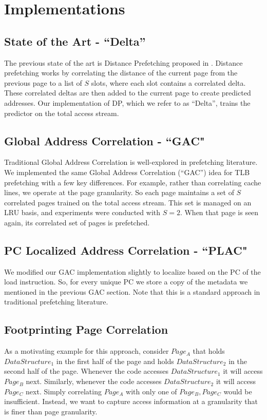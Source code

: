 \documentclass[conference]{IEEEtran}
\begin{document}
\section{Implementations} \label{Implementation}
    \subsection{State of the Art - ``Delta''}
        The previous state of the art is Distance Prefetching proposed in \cite{c1}. Distance prefetching works by correlating the distance of the current page from the previous page to a list of $S$ slots, where each slot contains a correlated delta. These correlated deltas are then added to the current page to create predicted addresses. Our implementation of DP, which we refer to as “Delta”, trains the predictor on the total access stream.     
    \subsection{Global Address Correlation - ``GAC"}
        Traditional Global Address Correlation is well-explored in prefetching literature. We implemented the same Global Address Correlation (``GAC'') idea for TLB prefetching with a few key differences. For example, rather than correlating cache lines, we operate at the page granularity. So each page maintains a set of $S$ correlated pages trained on the total access stream. This set is managed on an LRU basis, and experiments were conducted with $S = 2$. When that page is seen again, its correlated set of pages is prefetched. 
        
    \subsection{PC Localized Address Correlation - ``PLAC"}
        We modified our GAC implementation slightly to localize based on the PC of the load instruction. So, for every unique PC we store a copy of the metadata we mentioned in the previous GAC section. Note that this is a standard approach in traditional prefetching literature. 

    \subsection{Footprinting Page Correlation}
        As a motivating example for this approach, consider $Page_A$ that holds $Data Structure_1$ in the first half of the page and holds $DataStructure_2$ in the second half of the page. Whenever the code accesses $DataStructure_1$ it will access $Page_B$ next. Similarly, whenever the code accesses $DataStructure_2$ it will access $Page_C$ next. Simply correlating $Page_A$ with only one of $Page_B, Page_C$ would be insufficient. Instead, we want to capture access information at a granularity that is finer than page granularity. 
        
\end{document}
